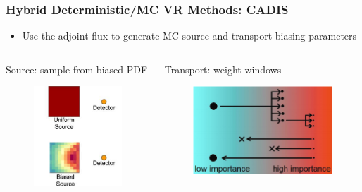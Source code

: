 \documentclass{beamer}
\begin{document}
\begin{frame}
\frametitle{Hybrid Deterministic/MC VR Methods: CADIS}
  \begin{itemize}
  \item{Use the adjoint flux to generate MC source and transport biasing
	  parameters}
  \end{itemize}
	\begin{columns}
			\begin{block}%
                                     {Source: sample from biased PDF}
                \begin{figure}
		\centering
		\includegraphics[scale=0.32]{bsrc_ex.jpg}
		\end{figure}
			\end{block}
                \begin{block}{Transport: weight windows}
			\vspace{0.1cm}
                \begin{figure}
		\centering
		\includegraphics[scale=0.51]{ww_ex2.png}
		\end{figure}
                \end{block}
	\end{columns}
\end{frame}
\end{document}
